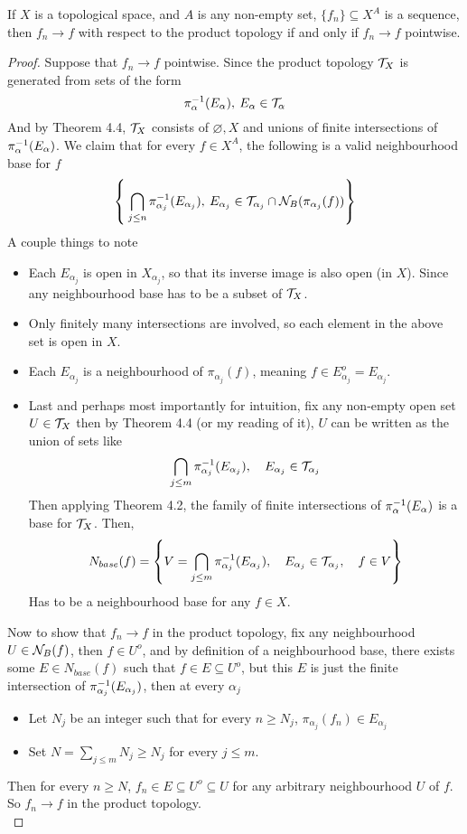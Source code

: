 \documentclass[../../main.tex]{subfiles}
\begin{document}
\begin{wts}
If $X$ is a topological space, and $A$ is any non-empty set, $\{f_n\}\subseteq X^A$ is a sequence, then $f_n\to f$ with respect to the product topology if and only if $f_n\to f$ pointwise.
\end{wts}
\begin{proof}
    Suppose that $f_n\to f$ pointwise. Since the product topology $\mathcal{T}_X$ is generated from sets of the form
    \[
    \pi_{\alpha}^{-1}({E_\alpha}),\:E_\alpha\in \mathcal{T}_\alpha
    \]
    And by Theorem 4.4, $\mathcal{T}_X$ consists of $\varnothing, X$ and unions of finite intersections of $\pi_{\alpha}^{-1}({E_\alpha})$. We claim that for every $f\in X^A$, the following is a valid neighbourhood base for $f$
    \[
    \left\{\:\bigcap_{j\leq n}\pi^{-1}_{\alpha_j}(E_{\alpha_j}),\:E_{\alpha_j}\in \mathcal{T}_{\alpha_j}\cap\mathcal{N}_B({\pi_{\alpha_j}(f)})\right\}
    \]
    A couple things to note
    \begin{itemize}
        \item Each $E_{\alpha_j}$ is open in $X_{\alpha_j}$, so that its inverse image is also open (in $X$). Since any neighbourhood base has to be a subset of $\mathcal{T}_X$.
        \item Only finitely many intersections are involved, so each element in the above set is open in $X$.
        \item Each $E_{\alpha_j}$ is a neighbourhood of $\pi_{\alpha_j}(f)$, meaning $f\in E_{\alpha_j}^o = E_{\alpha_j}$.
        \item Last and perhaps most importantly for intuition, fix any non-empty open set $U\in \mathcal{T}_X$ then by Theorem 4.4 (or my reading of it), $U$ can be written as the union of sets like
        \[
        \bigcap_{j\leq m}\pi_{\alpha_j}^{-1}({E_{\alpha_j}}),\quad E_{\alpha_j}\in\mathcal{T}_{\alpha_j}
        \]
        Then applying Theorem 4.2, the family of finite intersections of $\pi_{\alpha}^{-1}({E_\alpha})$ is a base for $\mathcal{T}_X$. Then, 
        \[
        N_{base}(f) = \left\{V=\bigcap_{j\leq m}\pi_{\alpha_j}^{-1}({E_{\alpha_j}}),\quad E_{\alpha_j}\in\mathcal{T}_{\alpha_j}, \quad f\in V\right\}
        \]
        Has to be a neighbourhood base for any $f\in X$.
    \end{itemize}
    Now to show that $f_n\to f$ in the product topology, fix any neighbourhood $U\in\mathcal{N}_B({f})$, then $f\in U^o$, and by definition of a neighbourhood base, there exists some $E\in N_{base}(f)$ such that $f\in E\subseteq U^o$, but this $E$ is just the finite intersection of $\pi_{\alpha_j}^{-1}({E_{\alpha_j}})$, then at every $\alpha_j$
    \begin{itemize}
        \item Let $N_j$ be an integer such that for every $n\geq N_j$, $\pi_{\alpha_j}(f_n)\in E_{\alpha_j}$
        \item Set $N = \sum_{j\leq m}N_j\geq N_j$ for every $j\leq m$.
    \end{itemize}
    Then for every $n\geq N$, $f_n\in E\subseteq U^o\subseteq U$ for any arbitrary neighbourhood $U$ of $f$. So $f_n\to f$ in the product topology.\\
    

\end{proof}
\end{document}
